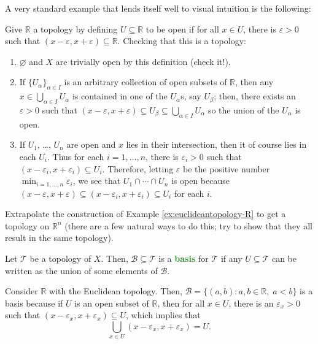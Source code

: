 \documentclass[11pt]{scrartcl}
\providecommand{\eps}{\varepsilon}
\providecommand{\RR}{\mathbb R}
\providecommand{\ii}{\item}
\providecommand{\vocab}[1]{{\textbf{\textcolor{ForestGreen}{#1}}}}
\begin{document}
A very standard example that lends itself well to visual intuition is the following:
\begin{example}
    [Euclidean topology on $\RR$]
    \label{ex:euclideantopology-R}
    Give $\RR$ a topology by defining $U\subseteq\RR$ to be open
    if for all $x\in U$, there is $\eps > 0$ such that $(x-\eps,x+\eps)\subseteq\RR$.
    Checking that this is a topology:
    \begin{enumerate}[(1)]
        \ii $\varnothing$ and $X$ are trivially open by this definition (check it!).
	\ii If $\{U_\alpha\}_{\alpha\in I}$ is an arbitrary collection of
	open subsets of $\RR$, then any $x\in\bigcup_{\alpha\in I}U_\alpha$
	is contained in one of the $U_\alpha$s, say $U_\beta$;
	then, there exists an $\eps>0$ such that
	$(x-\eps,x+\eps)\subseteq U_\beta\subseteq\bigcup_{\alpha\in I} U_\alpha$
	so the union of the $U_\alpha$ is open.
	\ii If $U_1$, \dots, $U_n$ are open and $x$ lies in their intersection,
	then it of course lies in each $U_i$. Thus for each $i=1,\dots,n$,
	there is $\eps_i>0$ such that $(x-\eps_i,x+\eps_i)\subseteq U_i$.
	Therefore, letting $\eps$ be the positive number $\min_{i=1,\dots,n}\eps_i$,
	we see that $U_1\cap\cdots\cap U_n$ is open because
	$(x-\eps,x+\eps)\subseteq (x-\eps_i,x+\eps_i)\subseteq U_i$ for each $i$.
    \end{enumerate}
\end{example}

\begin{exercise}
    \label{exer:extrapolate-euclideantop}
    Extrapolate the construction of Example \ref{ex:euclideantopology-R}
    to get a topology on $\RR^n$ (there are a few natural ways to do this;
    try to show that they all result in the same topology).
\end{exercise}

\begin{definition}[Basis]
    \label{def:basis}
    Let $\mathcal T$ be a topology of $X$.
    Then, $\mathcal B\subseteq\mathcal T$ is
    a \vocab{basis} for $\mathcal T$ if any $U\subseteq\mathcal T$
    can be written as the union of some elements of $\mathcal B$.
\end{definition}

\begin{example}
    \label{ex:euclideantopology-basis}
    Consider $\RR$ with the Euclidean topology.
    Then, $\mathcal B = \{(a,b) : a,b\in\RR,\; a<b\}$
    is a basis because if $U$ is an open subset of $\RR$,
    then for all $x\in U$, there is an $\eps_x>0$ such that
    $(x-\eps_x,x+\eps_x)\subseteq U$, which implies that
    \begin{equation*}
	\bigcup_{x\in U} (x-\eps_x,x+\eps_x) = U.
    \end{equation*}
\end{example}
\end{document}
